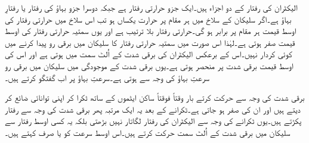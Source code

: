 الیکٹران کی رفتار کے دو اجزاء ہیں۔ایک جزو حرارتی رفتار ہے جبکہ دوسرا جزو بہاؤ کی رفتار یا رفتارِ بہاؤ ہے۔اگر سلیکان کے سلاخ میں ہر مقام پر حرارت یکساں ہو تب اس سلاخ میں حرارتی رفتار کی اوسط قیمت ہر مقام پر برابر ہو گی۔حرارتی رفتار بلا ترتیب ہے اور یوں سمتیہ حرارتی رفتار کی اوسط قیمت صفر ہوتی ہے۔لہٰذا اس صورت میں سمتیہ حرارتی رفتار کا سلیکان میں برقی رو پیدا کرنے میں کوئی کردار نہیں۔اس کے برعکس الیکٹران کی   برقی شدت کے اُلٹ سمت میں ہوتی ہے اور اس کی اوسط قیمت برقی شدت پر منحصر ہوتی ہے۔یوں برقی شدت کے موجودگی میں سلیکان میں برقی رو سرعتِ بہاؤ کی  وجہ سے ہوتی ہے۔سرعتِ بہاؤ پر اب گفتگو کرتے ہیں۔

برقی شدت کی وجہ سے حرکت کرتے بار وقتاً فوقتاً ساکن ایٹموں کے ساتھ ٹکرا کر اپنی توانائی ضائع کر دیتے ہیں اور ان کی   صفر ہو جاتی ہے۔ٹکرانے کے بعد یہ ایک مرتبہ پھر برقی شدت کی وجہ سے رفتار پکڑتے ہیں۔یوں ٹکرانے کی وجہ سے الیکٹران کی رفتار لگاتار نہیں بڑھتی بلکہ یہ کسی اوسط رفتار سے سلیکان میں برقی شدت کے اُلٹ سمت حرکت کرتے ہیں۔اس اوسط سرعت کو   یا صرف  کہتے ہیں۔ 

